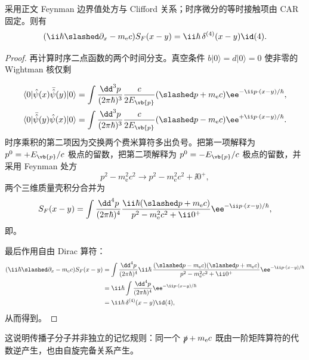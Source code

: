 \begin{proposition}
采用正文 Feynman 边界值处方与 Clifford 关系；时序微分的等时接触项由 CAR 固定。则有
\begin{equation}
 {
 (\ii\hbar\slashed\partial_x-m_{\mathrm e} c)S_F(x-y)
 =\ii\hbar\,\delta^{(4)}(x-y)\id(4).}
\label{eq:dirac-green-exact-r2}
\end{equation}
\end{proposition}
\begin{proof}
再计算时序二点函数的两个时间分支。真空条件 $b|0\rangle=d|0\rangle=0$ 使非零的 Wightman 核仅剩

\begin{align*}
 \langle0|\hat\psi(x)\bar{\hat\psi}(y)|0\rangle
 &=\int\frac{\dd^3 p}{(2\pi\hbar)^3}\frac{c}{2E_{\vb{p}}}
 (\slashed p+m_{\mathrm e} c)\ee^{-\ii p\cdot(x-y)/\hbar},\\
 \langle0|\bar{\hat\psi}(y)\hat\psi(x)|0\rangle
 &=\int\frac{\dd^3 p}{(2\pi\hbar)^3}\frac{c}{2E_{\vb{p}}}
 (\slashed p-m_{\mathrm e} c)\ee^{+\ii p\cdot(x-y)/\hbar}.
\end{align*}
时序乘积的第二项因为交换两个费米算符多出负号。把第一项解释为 $p^0=+E_{\vb{p}}/c$ 极点的留数，把第二项解释为 $p^0=-E_{\vb{p}}/c$ 极点的留数，并采用 Feynman 处方
\begin{equation*}
 p^2-m_{\mathrm e}^2c^2\longrightarrow p^2-m_{\mathrm e}^2c^2+\ii0^+,
\end{equation*}
两个三维质量壳积分合并为
\begin{equation*}
 S_F(x-y)
 =\int\frac{\dd^4 p}{(2\pi\hbar)^4}
 \frac{\ii\hbar(\slashed p+m_{\mathrm e} c)}{p^2-m_{\mathrm e}^2c^2+\ii0^+}
 \ee^{-\ii p\cdot(x-y)/\hbar},
\end{equation*}
即。

最后作用自由 Dirac 算符：
\begin{align*}
 (\ii\hbar\slashed\partial_x-m_{\mathrm e} c)S_F(x-y)
 &=\int\frac{\dd^4 p}{(2\pi\hbar)^4}\ii\hbar\,
 \frac{(\slashed p-m_{\mathrm e} c)(\slashed p+m_{\mathrm e} c)}{p^2-m_{\mathrm e}^2c^2+\ii0^+}
 \ee^{-\ii p\cdot(x-y)/\hbar}\\
 &=\ii\hbar\int\frac{\dd^4 p}{(2\pi\hbar)^4}
 \ee^{-\ii p\cdot(x-y)/\hbar}\\
 &=\ii\hbar\,\delta^{(4)}(x-y)\id(4),
\end{align*}
从而得到。
\end{proof}

这说明传播子分子并非独立的记忆规则：同一个 $\slashed p+m_{\mathrm e} c$ 既由一阶矩阵算符的代数逆产生，也由自旋完备关系产生。

